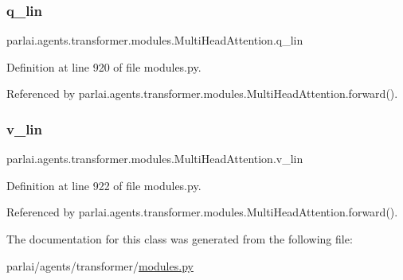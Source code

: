 \subsubsection{\texorpdfstring{q\+\_\+lin}{q\_lin}}
{\footnotesize\ttfamily parlai.\+agents.\+transformer.\+modules.\+Multi\+Head\+Attention.\+q\+\_\+lin}



Definition at line 920 of file modules.\+py.



Referenced by parlai.\+agents.\+transformer.\+modules.\+Multi\+Head\+Attention.\+forward().

\mbox{\label{classparlai_1_1agents_1_1transformer_1_1modules_1_1MultiHeadAttention_a1b1c33915c80f894221dfd4f0a0a2896}} 
\subsubsection{\texorpdfstring{v\+\_\+lin}{v\_lin}}
{\footnotesize\ttfamily parlai.\+agents.\+transformer.\+modules.\+Multi\+Head\+Attention.\+v\+\_\+lin}



Definition at line 922 of file modules.\+py.



Referenced by parlai.\+agents.\+transformer.\+modules.\+Multi\+Head\+Attention.\+forward().



The documentation for this class was generated from the following file\+:\begin{DoxyCompactItemize}
\item 
parlai/agents/transformer/\hyperlink{parlai_2agents_2transformer_2modules_8py}{modules.\+py}\end{DoxyCompactItemize}
